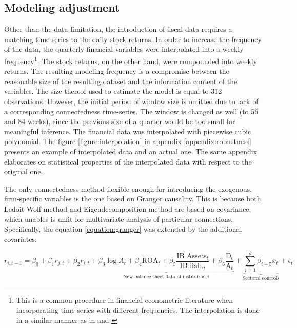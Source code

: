 \documentclass[12pt]{article}
\begin{document}
\subsection{Modeling adjustment}

Other than the data limitation, the introduction of fiscal data requires a matching time series to the daily stock returns. In order to increase the frequency of the data, the quarterly financial variables were interpolated into a weekly frequency\footnote{This is a common procedure in financial econometric literature when incorporating time series with different frequencies. The interpolation is done in a similar manner as in \citet{hautsch14a} and \citet{hautsch14}}. The stock returns, on the other hand, were compounded into weekly returns. The resulting modeling frequency is a compromise between the reasonable size of the resulting dataset and the information content of the variables. The size thereof used to estimate the model is equal to 312 observations. However, the initial period of window size is omitted due to lack of a corresponding connectedness time-series. The window is changed as well (to 56 and 84 weeks), since the previous size of a quarter would be too small for meaningful inference. The financial data was interpolated with piecewise cubic polynomial. The figure \ref{figure:interpolation} in appendix \ref{appendix:robustness} presents an example of interpolated data and an actual one. The same appendix elaborates on statistical properties of the interpolated data with respect to the original one.

The only connectedness method flexible enough for introducing the exogenous, firm-specific variables is the one based on Granger causality. This is because both Ledoit-Wolf method and Eigendecomposition method are based on covariance, which unables is unfit for multivariate analysis of particular connections. Specifically, the equation \ref{equation:granger} was extended by the additional covariates:

\begin{equation}
	r_{i,t+1} = \beta_0 + \beta_1 r_{j,t} + \beta_2 r_{i, t} + \underbrace{\beta_3 \log{A}_t + \beta_4 \text{ROA}_t + \beta_5 \frac{\text{IB Assets}_t}{\text{IB liab.}_t} + \beta_6 \frac{\text{D}_t}{\text{A}_t}}_{\text{New balance sheet data of institution $i$}} + \underbrace{\sum_{i=1}^{k} \beta_{i+5} x_{t}}_{\text{Sectoral controls}} +\epsilon_t
\end{equation}
\end{document}
